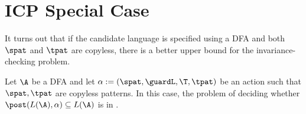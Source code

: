 
\section{ICP Special Case}\label{sec:c03-icp-special-case}

It turns out that if the candidate language is specified using a DFA and both $\spat$ and $\tpat$ are copyless, there is a better upper bound
for the invariance-checking problem.

\begin{theorem}
	Let $\A$ be a DFA and let $\alpha := (\spat, \guardL, \T, \tpat)$ be an action such that $\spat, \tpat$ are copyless patterns. In this case, the problem of deciding whether $\post(L(\A), \alpha) \subseteq L(\A)$ is in \conp.
\end{theorem}

